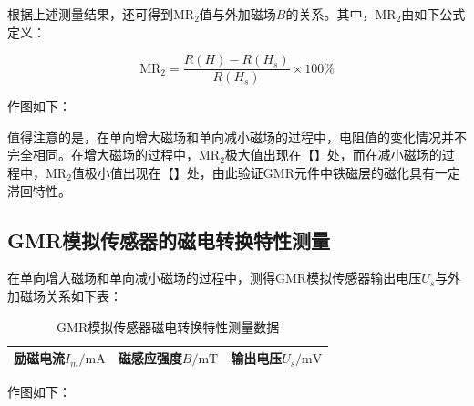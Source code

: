 \documentclass{thuemp}
\begin{document}
根据上述测量结果，还可得到$\mathrm{MR_2}$值与外加磁场$B$的关系。其中，$\mathrm{MR_2}$由如下公式定义：

\begin{equation}\label{eq:mr2}
    \mathrm{MR_2} = \frac{R(H) - R(H_s)}{R(H_s)} \times 100\%
\end{equation}

作图如下：

值得注意的是，在单向增大磁场和单向减小磁场的过程中，电阻值的变化情况并不完全相同。在增大磁场的过程中，$\mathrm{MR_2}$极大值出现在【】处，而在减小磁场的过程中，$\mathrm{MR_2}$值极小值出现在【】处，由此验证GMR元件中铁磁层的磁化具有一定滞回特性。

\subsection{GMR模拟传感器的磁电转换特性测量}

在单向增大磁场和单向减小磁场的过程中，测得GMR模拟传感器输出电压$U_s$与外加磁场关系如下表：

\begin{table}[H]
    \centering
    \captionnamefont{\wuhao\bf\heiti}
    \captiontitlefont{\wuhao\bf\heiti}
    \caption{GMR模拟传感器磁电转换特性测量数据} \label{tab:gmrsensor}
    \liuhao
    \begin{tabular}{|c|c|c|}
        \toprule
        励磁电流$I_m/\mathrm{mA}$ & 磁感应强度$B/\mathrm{mT}$ & 输出电压$U_s/\mathrm{mV}$ \\ \hline
        \midrule
        \bottomrule
    \end{tabular}
\end{table}

作图如下：

\end{document}
